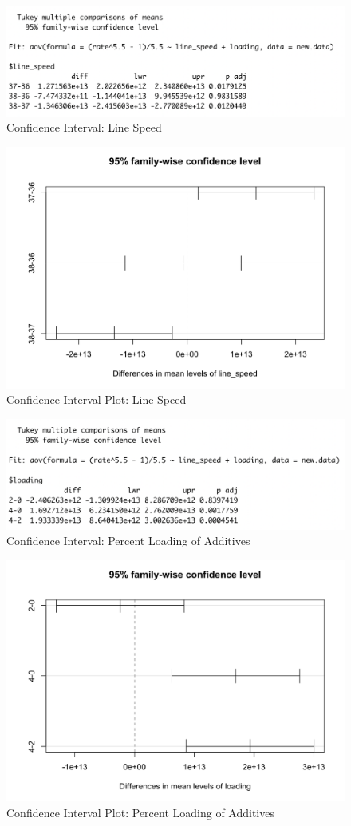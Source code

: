 \documentclass[11pt,a4paper]{article}
\begin{document}
\begin{figure}[htb]
    \centering
    \includegraphics[scale=0.8]{CI1}
    \caption{Confidence Interval: Line Speed}
    \label{}
\end{figure}
\begin{figure}[htb]
    \centering
    \includegraphics[scale=0.3]{CIP1}
    \caption{Confidence Interval Plot: Line Speed}
    \label{}
\end{figure}
\begin{figure}[htb]
    \centering
    \includegraphics[scale=0.8]{CI2}
    \caption{Confidence Interval: Percent Loading of Additives}
    \label{}
\end{figure}
\begin{figure}[htb]
    \centering
    \includegraphics[scale=0.3]{CIP2}
    \caption{Confidence Interval Plot: Percent Loading of Additives}
    \label{}
\end{figure}
\end{document}
